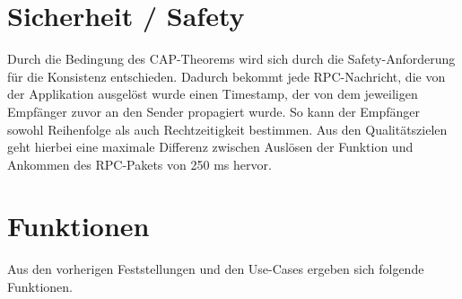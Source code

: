 
\section*{Sicherheit / Safety}

Durch die Bedingung des CAP-Theorems wird sich durch die Safety-Anforderung für die Konsistenz entschieden.
Dadurch bekommt jede RPC-Nachricht, die von der Applikation ausgelöst wurde einen Timestamp, der von dem jeweiligen Empfänger zuvor an den Sender propagiert wurde. So kann der Empfänger sowohl Reihenfolge als auch Rechtzeitigkeit bestimmen. Aus den Qualitätszielen geht hierbei eine maximale Differenz zwischen Auslösen der Funktion und Ankommen des RPC-Pakets von 250 ms hervor.
	

\section{Funktionen}
Aus den vorherigen Feststellungen und den Use-Cases ergeben sich folgende Funktionen.

